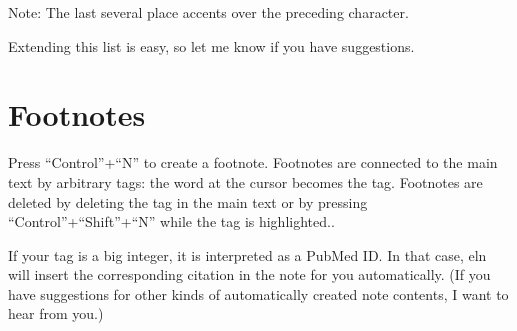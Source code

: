 \documentclass[11pt]{report}
\begin{document}
\bigskip

\noindent Note: The last several place accents over the preceding character.

Extending this list is easy, so let me know if you have suggestions.

\section{Footnotes}

Press ``Control''+``N'' to create a footnote. Footnotes are connected
to the main text by arbitrary tags: the word at the cursor
becomes the tag. Footnotes are deleted by deleting the tag in the main
text or by pressing ``Control''+``Shift''+``N'' while the tag is highlighted..

If your tag is a big integer, it is interpreted as a PubMed ID. In
that case, eln will insert the corresponding citation in the note for
you automatically. (If you have suggestions for other kinds of
automatically created note contents, I want to hear from you.)
\end{document}
